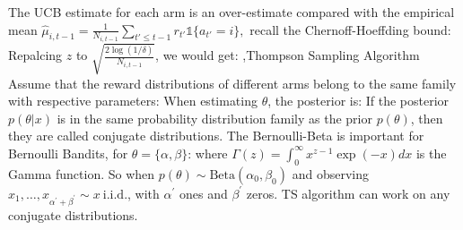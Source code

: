 \documentclass[10pt]{report}
\begin{document}
The UCB estimate for each arm is an over-estimate compared with the empirical mean $\hat{\mu}_{i,t-1}=\frac{1}{N_{i,t-1}}\sum_{t'\le t-1}r_{t'}\mathbb{1}\{a_{t'}=i\},$ recall the Chernoff-Hoeffding bound:
Repalcing $z$ to $\sqrt{\frac{2\log(1/\delta)}{N_{i,t-1}}}$, we would get:
\sep{Thompson Sampling Algorithm}
Assume that the reward distributions of different arms belong to the same family with respective parameters:
When estimating $\theta$, the posterior is:
If the posterior $p(\theta|x)$ is in the same probability distribution family as the prior $p(\theta)$, then they are called conjugate distributions.
The Bernoulli-Beta is important for Bernoulli Bandits, for $\theta=\{\alpha,\beta\}$:
where $\Gamma(z)=\int_{0}^{\infty}x^{z-1}\exp(-x)dx$ is the Gamma function. So when $p(\theta)\sim\mathrm{Beta}(\alpha_{0},\beta_{0})$ and
observing $x_1,\ldots,x_{\alpha^{\prime}+\beta^{\prime}}\sim x\mathrm{~i.i.d.}$, with $\alpha^\prime$ ones and $\beta^\prime$ zeros.
TS algorithm can work on any conjugate distributions.
\end{document}
